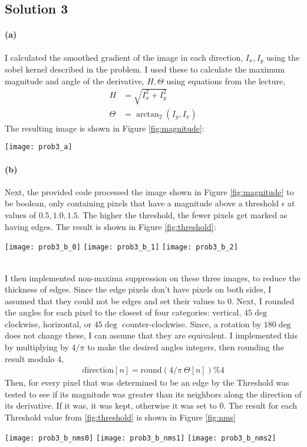 \documentclass{article}
\newcommand{\solution}[1]{\clearpage \subsection*{Solution #1}}
\newcommand{\spart}[1]{\paragraph{(#1)}}
\begin{document}
\solution{3} 

\spart{a} I calculated the smoothed gradient of the image in each direction, $I_x, I_y$ using the sobel kernel described in the problem. I used these to calculate the maximum magnitude and angle of the derivative, $H,\Theta$ using equations from the lecture,
\begin{align}
	H &= \sqrt{I_x^2 + I_y^2}\\
	\Theta &= \arctan_2(I_y,I_x)
\end{align}
The resulting image is shown in Figure \ref{fig:magnitude}:
\begin{figure*}[!h]
	\centering
	\texttt{[image: prob3\_a]}
	\caption{Magnitude $H$ of the Sobel Derivative of the Image for Problem 3}
	\label{fig:magnitude}
\end{figure*}
\spart{b} Next, the provided code processed the image shown in Figure \ref{fig:magnitude} to be boolean, only containing pixels that have a magnitude above a threshold $\epsilon$ at values of $0.5, 1.0, 1.5$. The higher the threshold, the fewer pixels get marked as having edges. The result is shown in Figure \ref{fig:threshold}: \\
\begin{figure*}[!h]
	\centering
	\texttt{[image: prob3\_b\_0]}
	\texttt{[image: prob3\_b\_1]}
	\texttt{[image: prob3\_b\_2]}
	\caption{Different $\epsilon$ Threshold Values for Edge Detection. From left to right: $0.5, 1.0, 1.5$}
	\label{fig:threshold}
\end{figure*} \\
I then implemented non-maxima suppression on these three images, to reduce the thickness of edges. Since the edge pixels don't have pixels on both sides, I assumed that they could not be edges and set their values to 0. Next, I rounded the angles for each pixel to the closest of four categories: vertical, $45\deg$ clockwise, horizontal, or $45\deg$ counter-clockwise. Since, a rotation by $180\deg$ does not change these, I can assume that they are equivalent. I implemented this by multiplying by $4/\pi$ to make the desired angles integers, then rounding the result modulo 4,
\begin{align}
	\text{direction}[n] = \text{round}(4/\pi \ \Theta [n]) \% 4
\end{align}
Then, for every pixel that was determined to be an edge by the Threshold was tested to see if its magnitude was greater than its neighbors along the direction of its derivative. If it was, it was kept, otherwise it was set to 0. The result for each Threshold value from \ref{fig:threshold} is shown in Figure \ref{fig:nms}
\begin{figure*}[!h]
	\centering
	\texttt{[image: prob3\_b\_nms0]}
	\texttt{[image: prob3\_b\_nms1]}
	\texttt{[image: prob3\_b\_nms2]}
	\caption{Result of NMS After Thresholding for $\epsilon = 0.5, 1.0, 1.5$ from left to right}
	\label{fig:nms}
\end{figure*}
\end{document}
